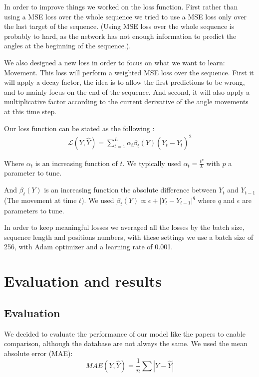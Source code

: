 \documentclass[final]{cvpr}
\begin{document}
In order to improve things we worked on the loss function. First rather than using a MSE loss over the whole sequence we tried to use a MSE loss only over the last target of the sequence. (Using MSE loss over the whole sequence is probably to hard, as the network has not enough information to predict the angles at the beginning of the sequence.).

We also designed a new loss in order to focus on what we want to learn: Movement.
This loss will perform a weighted MSE loss over the sequence. First it will apply a decay factor, the idea is to allow the first predictions to be wrong, and to mainly focus on the end of the sequence. And second, it will also apply a multiplicative factor according to the current derivative of the angle movements at this time step.

Our loss function can be stated as the following :
\begin{equation*}
    \begin{aligned}
        \mathcal{L}(Y,\hat{Y})= \sum_{t=1}^L \alpha_t \beta_t(Y) (Y_t - \hat{Y}_t)^2
    \end{aligned}
\end{equation*}

Where $\alpha_t$ is an increasing function of $t$. We typically used $\alpha_t = \frac{t^p}{L}$ with $p$ a parameter to tune.

And $\beta_t(Y)$ is an increasing function the absolute difference between $Y_t$ and $Y_{t-1}$ (The movement at time $t$). We used $\beta_t(Y) \propto \epsilon + |Y_t - Y_{t-1}|^q$ where $q$ and $\epsilon$ are parameters to tune.

In order to keep meaningful losses we averaged all the losses by the batch size, sequence length and positions numbers, with these settings we use a batch size of 256, with Adam optimizer and a learning rate of 0.001.

\section{Evaluation and results}
\subsection{Evaluation}
\label{section:evaluation}
We decided to evaluate the performance of our model like the papers \cite{Koch,Kir,Quivira} to enable comparison, although the database are not always the same. We used the mean absolute error (MAE): 
$$MAE(Y,\hat{Y})=\frac{1}{n}\sum |Y-\hat{Y}|$$
\end{document}
